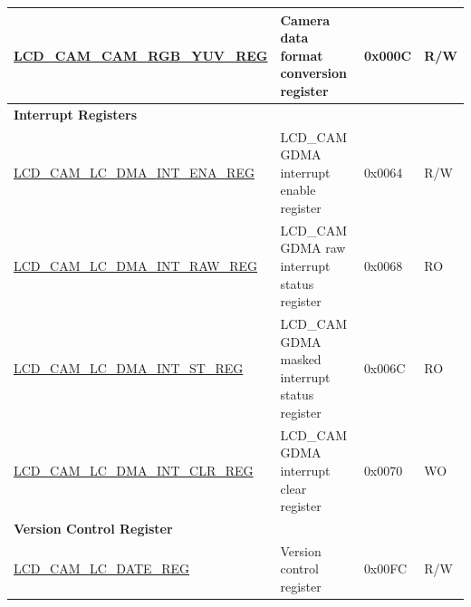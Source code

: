\begin{longtable}{ | p{6.4cm} | p{6.8cm} | p{1.3cm} | p{1cm} | }
\hyperref[regdesc:LCDCAMCAMRGBYUVREG]{LCD\_CAM\_CAM\_RGB\_YUV\_REG} & Camera data format conversion register & 0x000C & R/W \\ \hline
\multicolumn{4}{|l|}{\textbf{Interrupt Registers}} \\ \hline
\hyperref[regdesc:LCDCAMLCDMAINTENAREG]{LCD\_CAM\_LC\_DMA\_INT\_ENA\_REG} & LCD\_CAM GDMA interrupt enable register & 0x0064 & R/W \\ \hline
\hyperref[regdesc:LCDCAMLCDMAINTRAWREG]{LCD\_CAM\_LC\_DMA\_INT\_RAW\_REG} & LCD\_CAM GDMA raw interrupt status register & 0x0068 & RO \\ \hline
\hyperref[regdesc:LCDCAMLCDMAINTSTREG]{LCD\_CAM\_LC\_DMA\_INT\_ST\_REG} & LCD\_CAM GDMA masked interrupt status register & 0x006C & RO \\ \hline
\hyperref[regdesc:LCDCAMLCDMAINTCLRREG]{LCD\_CAM\_LC\_DMA\_INT\_CLR\_REG} & LCD\_CAM GDMA interrupt clear register & 0x0070 & WO \\ \hline
\multicolumn{4}{|l|}{\textbf{Version Control Register}} \\ \hline
\hyperref[regdesc:LCDCAMLCREGDATEREG]{LCD\_CAM\_LC\_DATE\_REG} & Version control register & 0x00FC & R/W \\ \hline
\end{longtable}
